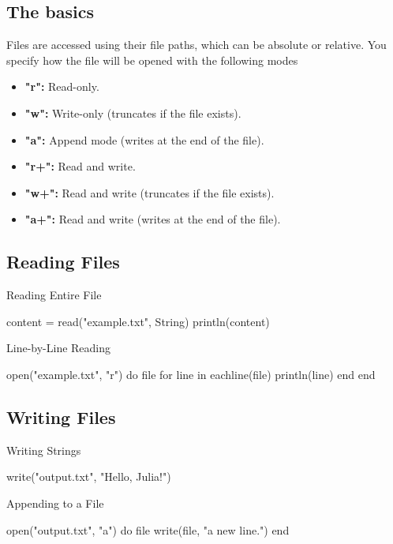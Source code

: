 \documentclass{report}
\begin{document}
     \subsection{The basics}
     \bigbreak \noindent 
     Files are accessed using their file paths, which can be absolute or relative. You specify how the file will be opened with the following modes
     \begin{itemize}
         \item \textbf{"r":} Read-only.
         \item \textbf{"w":} Write-only (truncates if the file exists).
         \item \textbf{"a":} Append mode (writes at the end of the file).
         \item \textbf{"r+":} Read and write.
         \item \textbf{"w+":} Read and write (truncates if the file exists).
         \item \textbf{"a+":} Read and write (writes at the end of the file).
     \end{itemize}

     \bigbreak \noindent 
     \subsection{Reading Files}
     \bigbreak \noindent 
     Reading Entire File
     \bigbreak \noindent 
     \begin{jlcode}
         content = read("example.txt", String)
         println(content)
     \end{jlcode}
     \bigbreak \noindent 
     Line-by-Line Reading
     \bigbreak \noindent 
     \begin{jlcode}
         open("example.txt", "r") do file
             for line in eachline(file)
                 println(line)
             end
         end
     \end{jlcode}

     \bigbreak \noindent 
     \subsection{Writing Files}
     \bigbreak \noindent 
     Writing Strings
     \bigbreak \noindent 
     \begin{jlcode}
     write("output.txt", "Hello, Julia!")
     \end{jlcode}
     \bigbreak \noindent 
     Appending to a File
     \bigbreak \noindent 
     \begin{jlcode}
         open("output.txt", "a") do file
             write(file, "\nAdding a new line.")
         end
     \end{jlcode}
\end{document}
